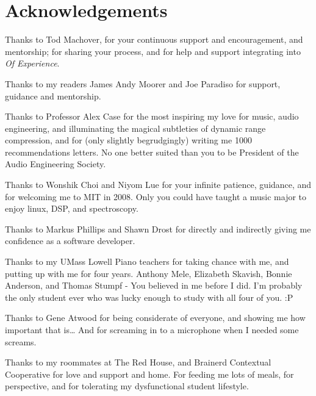 \clearpage
\chapter*{Acknowledgements}
\label{ch:acknowledgements}


\begin{fullwidth}
\noindent Thanks to Tod Machover, for your continuous support and
encouragement, and mentorship; for sharing your process, and for
help and support integrating \thesis into \textit{Of Experience}.

\vspace{5mm}
\noindent Thanks to my readers James Andy Moorer and Joe Paradiso for
support, guidance and mentorship.

\vspace{5mm}
\noindent Thanks to Professor Alex Case for the most inspiring my love
for music, audio engineering, and illuminating the magical subtleties
of dynamic range compression, and for (only slightly begrudgingly)
writing me 1000 recommendations letters. No one better suited than you
to be President of the Audio Engineering Society.

\vspace{5mm}
\noindent Thanks to Wonshik Choi and Niyom Lue for your infinite
patience, guidance, and for welcoming me to MIT in 2008. Only you
could have taught a music major to enjoy linux, DSP, and spectroscopy.

\vspace{5mm}
\noindent Thanks to Markus Phillips and Shawn Drost for directly and indirectly
giving me confidence as a software developer.

\vspace{5mm}
\noindent Thanks to my UMass Lowell Piano teachers for taking chance with me,
and putting up with me for four years. Anthony Mele, Elizabeth
Skavish, Bonnie Anderson, and Thomas Stumpf - You believed in me
before I did. I'm probably the only student ever who was lucky enough
to study with all four of you. :P

\vspace{5mm}
\noindent  Thanks to Gene Atwood for being considerate of everyone, and showing
me how important that is\ldots{} And for screaming in to a microphone when
I needed some screams.

\vspace{5mm}
\noindent  Thanks to my roommates at The Red House, and Brainerd Contextual
Cooperative for love and support and home. For feeding me lots of
meals, for perspective, and for tolerating my dysfunctional student
lifestyle.


\end{fullwidth}
